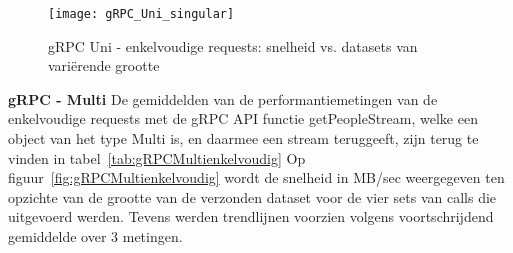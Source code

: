 \begin{figure}[ht]
    \centering
    \texttt{[image: gRPC\_Uni\_singular]}
    \caption{gRPC Uni - enkelvoudige requests: snelheid vs. datasets van vari\"erende grootte}
    \label{fig:gRPCUnienkelvoudig}
\end{figure}

\textbf{gRPC - Multi}\newline
De gemiddelden van de performantiemetingen van de enkelvoudige requests met de gRPC API functie getPeopleStream, welke een object van het type Multi is, en daarmee een stream
teruggeeft, zijn terug te vinden in tabel~\ref{tab:gRPCMultienkelvoudig}
Op figuur~\ref{fig:gRPCMultienkelvoudig} wordt de snelheid in MB/sec weergegeven ten opzichte van de grootte van de verzonden dataset voor de vier sets van
calls die uitgevoerd werden. Tevens werden trendlijnen voorzien volgens voortschrijdend gemiddelde over 3 metingen.\\

